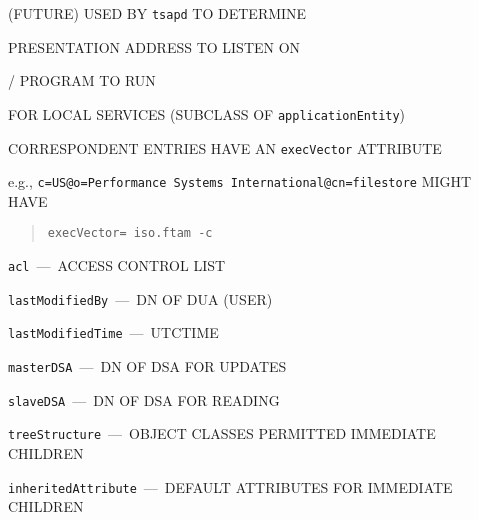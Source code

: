 \begin{bwslide}

\begin{nrtc}
\item	(FUTURE) USED BY \verb"tsapd" TO DETERMINE
    \begin{nrtc}
    \item	PRESENTATION ADDRESS TO LISTEN ON

    \item	\unix/ PROGRAM TO RUN
    \end{nrtc}
    FOR LOCAL SERVICES (SUBCLASS OF \verb"applicationEntity")

\item	CORRESPONDENT ENTRIES HAVE AN \verb"execVector" ATTRIBUTE

\item	e.g., \verb"c=US@o=Performance Systems International@cn=filestore"
	MIGHT HAVE
\begin{quote}\small\begin{verbatim}
execVector= iso.ftam -c
\end{verbatim}\end{quote}
\end{nrtc}
\end{bwslide}


\begin{bwslide}

\begin{nrtc}
\item	\verb"acl"~---~ACCESS CONTROL LIST

\item	\verb"lastModifiedBy"~---~DN OF DUA (USER)

\item	\verb"lastModifiedTime"~---~UTCTIME
\end{nrtc}
\end{bwslide}


\begin{bwslide}

\begin{nrtc}
\item	\verb"masterDSA"~---~DN OF DSA FOR UPDATES

\item	\verb"slaveDSA"~---~DN OF DSA FOR READING

\item	\verb"treeStructure"~---~OBJECT CLASSES PERMITTED IMMEDIATE CHILDREN

\item	\verb"inheritedAttribute"~---~DEFAULT ATTRIBUTES FOR IMMEDIATE CHILDREN
\end{nrtc}
\end{bwslide}



